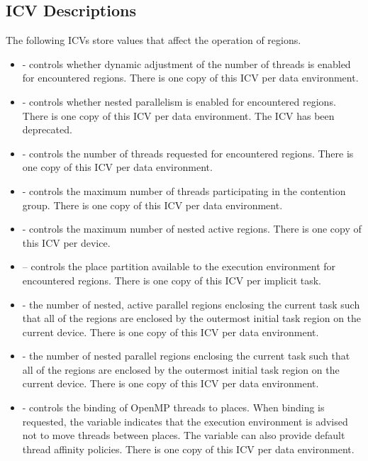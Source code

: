 \subsection{ICV Descriptions}
\label{subsec:ICV Descriptions}
The following ICVs store values that affect the operation of  regions.

\begin{itemize}
\item {} - controls whether dynamic adjustment of the number of threads is enabled
for encountered  regions. There is one copy of this ICV per data
environment.

\item {} - controls whether nested parallelism is enabled for encountered 
regions. There is one copy of this ICV per data environment. The  ICV has been deprecated.

\item {} - controls the number of threads requested for encountered 
regions. There is one copy of this ICV per data environment.

\item {} - controls the maximum number of threads participating in the
contention group. There is one copy of this ICV per data environment.

\item {} - controls the maximum number of nested active 
regions. There is one copy of this ICV per device.

\item {} -- controls the place partition available to the execution
environment for encountered  regions. There is one copy of this ICV per
implicit task.

\item {} - the number of nested, active parallel regions enclosing the current
task such that all of the  regions are enclosed by the outermost initial task
region on the current device. There is one copy of this ICV per data environment.

\item {} - the number of nested parallel regions enclosing the current task such that
all of the  regions are enclosed by the outermost initial task region on the
current device. There is one copy of this ICV per data environment.

\item {} - controls the binding of OpenMP threads to places. When binding is
requested, the variable indicates that the execution environment is advised not to
move threads between places. The variable can also provide default thread affinity
policies. There is one copy of this ICV per data environment.
\end{itemize}

